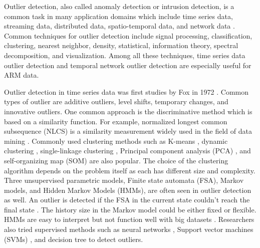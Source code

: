\documentclass[letterpaper, 10 pt, conference]{ieeeconf}  %
\begin{document}
Outlier detection, also called anomaly detection or intrusion detection, is a common task in many application domains which include time series data, streaming data, distributed data, spatio-temporal data, and network data \cite{gupta2014outlier}. Common techniques for outlier detection include signal processing, classification, clustering, nearest neighbor, density, statistical, information theory, spectral decomposition, and visualization. Among all these techniques, time series data outlier detection and temporal network outlier detection are especially useful for ARM data.

Outlier detection in time series data was first studies by Fox in 1972 \cite{fox1972outliers}. Common types of outlier are additive outliers, level shifts, temporary changes, and innovative outliers. One common approach is the discriminative method which is based on a similarity function. For example, normalized longest common subsequence (NLCS) is a similarity measurement widely used in the field of data mining \cite{budalakoti2009anomaly, chandola2008comparative, sequeira2002admit}. Commonly used clustering methods such as K-means \cite{macqueen1967some}, dynamic clustering \cite{sequeira2002admit}, single-linkage clustering \cite{portnoy2001intrusion}, Principal component analysis (PCA) \cite{gupta2013context}, and self-organizing map (SOM) \cite{gonzalez2003anomaly} are also popular. The choice of the clustering algorithm depends on the problem itself as each has different size and complexity. Three unsupervised parametric models, Finite state automata (FSA), Markov models, and Hidden Markov Models (HMMs), are often seen in outlier detection as well. An outlier is detected if the FSA in the current state couldn't reach the final state \cite{chandola2008comparative}. The history size in the Markov model could be either fixed or flexible. HMMs are easy to interpret but not function well with big datasets \cite{chandola2008comparative}. Researchers also tried supervised methods such as neural networks \cite{dasgupta2000comparison}, Support vector machines (SVMs) \cite{li2006motion}, and decision tree \cite{kang2005learning} to detect outliers.
\end{document}
